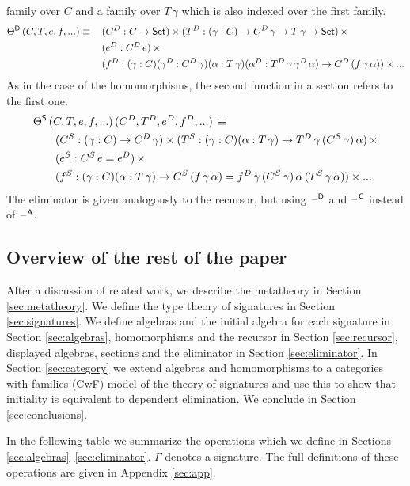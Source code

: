 \documentclass[acmsmall,review,anonymous]{acmart}\settopmatter{printfolios=true,printccs=false,printacmref=false}
\begin{document}
family over $C$ and a family over $T\,\gamma$ which is also indexed
over the first family.
\begin{alignat*}{5}
  & \Theta^{\mathsf{D}}\,(C,T,e,f,...)\equiv\, && (C^D:C\rightarrow \mathsf{Set})\times(T^D:(\gamma:C)\rightarrow C^D\,\gamma\rightarrow T\,\gamma\rightarrow \mathsf{Set})\,\times \\
  & && (e^D:C^D\,e)\,\times \\
  & && (f^D:(\gamma:C)(\gamma^D:C^D\,\gamma)(\alpha:T\,\gamma)(\alpha^D:T^D\,\gamma\,\gamma^D\,\alpha)\rightarrow C^D\,(f\,\gamma\,\alpha))\times...
\end{alignat*}
As in the case of the homomorphisms, the second function in a section
refers to the first one.
\begin{alignat*}{5}
  & \Theta^{\mathsf{S}}\,(C,T,e,f,...)\,(C^D,T^D,e^D,f^D,...)\,\equiv \\
  & \hspace{2em} (C^S:(\gamma:C)\rightarrow C^D\,\gamma)\times(T^S:(\gamma:C)(\alpha:T\,\gamma)\rightarrow T^D\,\gamma\,(C^S\,\gamma)\,\alpha)\,\times \\
  & \hspace{2em} (e^S:C^S\,e=e^D)\,\times \\
  & \hspace{2em} (f^S:(\gamma:C)(\alpha:T\,\gamma)\rightarrow C^S\,(f\,\gamma\,\alpha)=f^D\,\gamma\,(C^S\,\gamma)\,\alpha\,(T^S\,\gamma\,\alpha))\times ...
\end{alignat*}
The eliminator is given analogously to the recursor, but using
$\mathord{\hspace{1pt}\text{--}\hspace{1pt}}^{\mathsf{D}}$ and $\mathord{\hspace{1pt}\text{--}\hspace{1pt}}^{\mathsf{C}}$ instead of $\mathord{\hspace{1pt}\text{--}\hspace{1pt}}^{\mathsf{A}}$.

\subsection{Overview of the rest of the paper}

After a discussion of related work, we describe the metatheory in
Section \ref{sec:metatheory}. We define the type theory of signatures
in Section \ref{sec:signatures}. We define algebras and the initial
algebra for each signature in Section \ref{sec:algebras},
homomorphisms and the recursor in Section \ref{sec:recursor},
displayed algebras, sections and the eliminator in Section
\ref{sec:eliminator}. In Section \ref{sec:category} we extend algebras
and homomorphisms to a categories with families (CwF) model of the
theory of signatures and use this to show that initiality
is equivalent to dependent elimination. We conclude in
Section \ref{sec:conclusions}.

In the following table we summarize the operations which we define in
Sections \ref{sec:algebras}--\ref{sec:eliminator}. $\Gamma$ denotes a
signature. The full definitions of these operations are given in
Appendix \ref{sec:app}.
\end{document}
